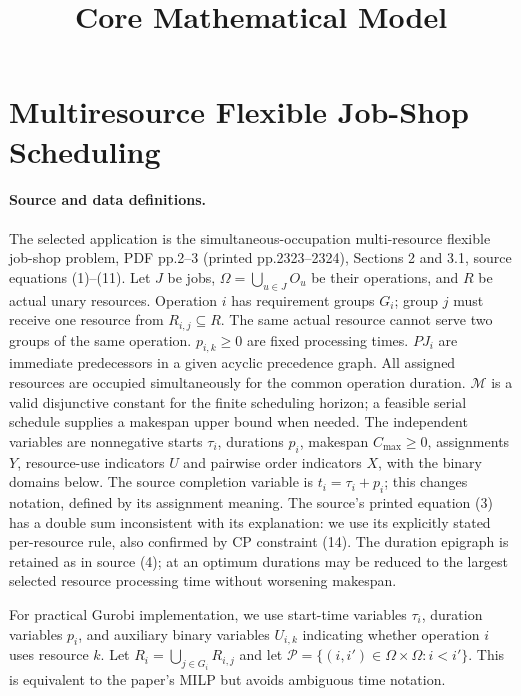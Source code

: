 \documentclass{article}
\title{Core Mathematical Model}
\date{}
\begin{document}
\maketitle

\section*{Multiresource Flexible Job-Shop Scheduling}

\paragraph{Source and data definitions.}
The selected application is the simultaneous-occupation multi-resource flexible
job-shop problem, PDF pp.2--3 (printed pp.2323--2324), Sections 2 and 3.1,
source equations (1)--(11). Let $J$ be jobs, $\Omega=\bigcup_{u\in J}O_u$
be their operations, and $R$ be actual unary resources. Operation $i$ has
requirement groups $G_i$; group $j$ must receive one resource from
$R_{i,j}\subseteq R$. The same actual resource cannot serve two groups of
the same operation. $p_{i,k}\ge0$ are fixed processing times. $PJ_i$ are
immediate predecessors in a given acyclic precedence graph. All assigned
resources are occupied simultaneously for the common operation duration.
$\mathcal M$ is a valid disjunctive constant for the finite scheduling horizon;
a feasible serial schedule supplies a makespan upper bound when needed.
The independent variables are nonnegative starts $\tau_i$, durations $p_i$,
makespan $C_{\max}\ge0$, assignments $Y$, resource-use indicators $U$ and
pairwise order indicators $X$, with the binary domains below.
The source completion variable is $t_i=\tau_i+p_i$; this changes notation,
defined by its assignment meaning. The source's printed equation (3)
has a double sum inconsistent with its explanation: we use its explicitly
stated per-resource rule, also confirmed by CP constraint (14). The duration
epigraph is retained as in source (4); at an optimum durations may be reduced
to the largest selected resource processing time without worsening makespan.


For practical Gurobi implementation, we use start-time variables $\tau_i$, duration variables $p_i$, and auxiliary binary variables $U_{i,k}$ indicating whether operation $i$ uses resource $k$. Let $R_i = \bigcup_{j \in G_i} R_{i,j}$ and let $\mathcal{P} = \{(i,i') \in \Omega \times \Omega : i < i'\}$. This is equivalent to the paper's MILP but avoids ambiguous time notation.
\end{document}
